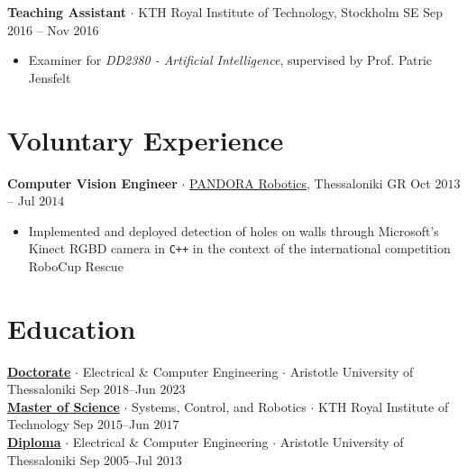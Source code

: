 \documentclass[a4paper,10pt,twoside]{article}
\begin{document}
  \noindent\textbf{Teaching Assistant} $\cdot$ KTH Royal Institute of Technology, Stockholm SE \hfill Sep 2016 -- Nov 2016 \\
  \begin{minipage}[t]{\textwidth}
    \begin{itemize}
      \item Examiner for \textit{DD2380 - Artificial Intelligence}, supervised by Prof. Patric Jensfelt
    \end{itemize}
  \end{minipage}

\section{Voluntary Experience}

\textbf{Computer Vision Engineer} $\cdot$ \href{https://issel.ee.auth.gr/pandora-robotics/}{PANDORA Robotics}, Thessaloniki GR \hfill Oct $2013$ -- Jul $2014$
  \begin{minipage}[t]{\textwidth}
    \begin{itemize}
      \item Implemented and deployed detection of holes on walls through Microsoft's Kinect RGBD camera in \texttt{C++} in the context of the international competition RoboCup Rescue
    \end{itemize}
  \end{minipage}

\section{Education}

\noindent \href{https://ikee.lib.auth.gr/record/354644}{\textbf{Doctorate}} $\cdot$ Electrical \& Computer Engineering $\cdot$ Aristotle University of Thessaloniki \hfill Sep $2018$--Jun $2023$ \\
\href{http://kth.diva-portal.org/smash/record.jsf?pid=diva2\%3A1102597\&dswid=2875}{\textbf{Master of Science}} $\cdot$ Systems, Control, and Robotics $\cdot$ KTH Royal Institute of Technology \hfill Sep $2015$--Jun $2017$ \\
\href{https://ikee.lib.auth.gr/record/291560}{\textbf{Diploma}} $\cdot$ Electrical \& Computer Engineering $\cdot$ Aristotle University of Thessaloniki \hfill Sep 2005--Jul $2013$
\end{document}

